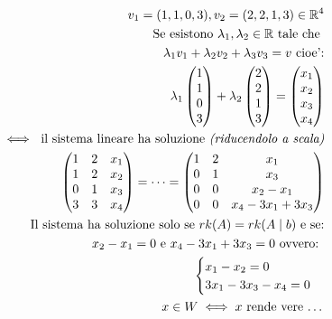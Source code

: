 \documentclass[a4paper,12pt]{article}
\begin{document}
\begin{align*}
    v_1=(1,1,0,3), v_2=(2,2,1,3) \in \mathbb{R}^4 \\
    \text{Se esistono } \lambda_1,\lambda_2 \in \mathbb{R} \text{ tale che } \\
    \lambda_1 v_1 + \lambda_2 v_2 + \lambda_3 v_3 = v \text{ cioe':} \\
    \lambda_1\begin{pmatrix}
        1 \\ 1 \\ 0 \\ 3
    \end{pmatrix}
    + \lambda_2 \begin{pmatrix}
        2 \\ 2 \\ 1 \\3
    \end{pmatrix}
    = \begin{pmatrix}
        x_1 \\ x_2 \\ x_3 \\ x_4
    \end{pmatrix} \\
    \iff \text{ il sistema lineare ha soluzione \textit{(riducendolo a scala)}} \\
    \begin{pmatrix}
        1 & 2 & x_1 \\
        1 & 2 & x_2 \\
        0 & 1 & x_3 \\
        3 & 3 & x_4
    \end{pmatrix} 
    =\dots=\begin{pmatrix}
        1 & 2 & x_1 \\
        0 & 1 & x_3 \\
        0 & 0 & x_2-x_1 \\
        0 & 0 & x_4-3x_1+3x_3
    \end{pmatrix}
    \\ \text{Il sistema ha soluzione solo se $rk(A)=rk(A\mid b)$ e se:}
    \\ x_2-x_1=0 \text{ e } x_4-3x_1+3x_3=0 \text{ ovvero: } \\
    \begin{cases}
        x_1-x_2=0 \\
        3x_1-3x_3-x_4=0
    \end{cases} \\
    x\in W \iff x \text{ rende vere \dots}
\end{align*}
\end{document}

